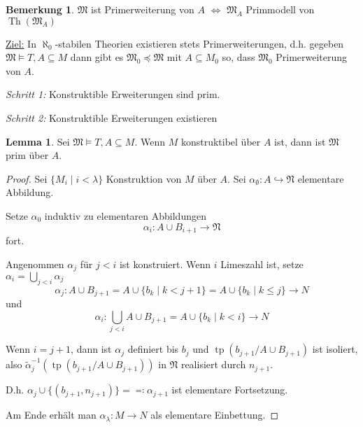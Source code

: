 \documentclass[12pt,parskip=full]{scrartcl}
\newcommand{\heading}{\underline}
\theoremstyle{definition}
\newtheorem{lemma}[theorem]{Lemma}
\newtheorem{remark}[theorem]{Bemerkung}
\begin{document}
 	\begin{remark}
 		$\mathfrak{M}$ ist Primerweiterung von $A$ $\Leftrightarrow$ $\mathfrak{M}_A$ Primmodell von $\operatorname{Th}(\mathfrak{M}_A)$
 	\end{remark}
 
 	\heading{Ziel:} In $\aleph_0$-stabilen Theorien existieren stets Primerweiterungen, d.h. gegeben $\mathfrak{M} \models T, A \subseteq M$ dann gibt es $\mathfrak{M}_0 \preccurlyeq \mathfrak{M}$ mit $A \subseteq M_0$ so, dass $\mathfrak{M}_0$ Primerweiterung von $A$.
 	
 	\textit{Schritt 1:} Konstruktible Erweiterungen sind prim.
 	
 	\textit{Schritt 2:} Konstruktible Erweiterungen existieren
 	
 	\begin{lemma}
 		Sei $\mathfrak{M} \models T, A \subseteq M$. Wenn $M$ konstruktibel über $A$ ist, dann ist $\mathfrak{M}$ prim über $A$.
 	\end{lemma}
 
 	\begin{proof}
 		Sei $\{ M_i \mid i < \lambda \}$ Konstruktion von $M$ über $A$. Sei $\alpha_\emptyset: A \hookrightarrow \mathfrak{N}$ elementare Abbildung.
 		
 		Setze $\alpha_0$ induktiv zu elementaren Abbildungen
 		\begin{equation*}
	 		\alpha_i: A \cup B_{i+1} \to \mathfrak{N}
 		\end{equation*}
 		fort.
 		
 		Angenommen $\alpha_j$ für $j < i$ ist konstruiert. Wenn $i$ Limeszahl ist, setze $\alpha_i = \bigcup_{j < i} \alpha_j$
 		\begin{equation*}
	 		\alpha_j: A \cup B_{j+1} = A \cup \{ b_k \mid k < j + 1 \} = A \cup \{ b_k \mid k \leq j \} \to N
 		\end{equation*}
 		und
 		\begin{equation*}
	 		\alpha_i: \bigcup_{j < i} A \cup B_{j+1} = A \cup \{ b_k \mid k < i \} \to N
 		\end{equation*}
 		
 		Wenn $i = j+1$, dann ist $\alpha_j$ definiert bis $b_j$ und $\operatorname{tp}(b_{j+1}/A \cup B_{j+1})$ ist isoliert, also $\tilde{\alpha}_j^{-1}(\operatorname{tp}(b_{j+1} / A \cup B_{j+1}))$ in $\mathfrak{N}$ realisiert durch $n_{j+1}$.
 		
 		D.h. $\alpha_j \cup \{ (b_{j+1}, n_{j+1}) \} = \eqqcolon \alpha_{j+1}$ ist elementare Fortsetzung.
 		
 		Am Ende erhält man $\alpha_\lambda: M \to N$ als elementare Einbettung.
 	\end{proof}
 
\end{document}
